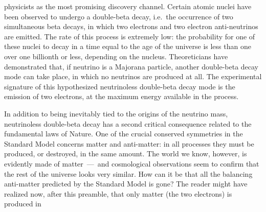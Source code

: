 physicists as the most promising discovery channel. Certain atomic nuclei have been
observed to undergo a double-beta decay, i.e.~the occurrence of two simultaneous beta
decays, in which two electrons and two electron anti-neutrinos are emitted. The rate of
this process is extremely low: the probability for one of these nuclei to decay in a time
equal to the age of the universe is less than one over one billionth or less, depending
on the nucleus. Theoreticians have demonstrated that, if neutrino is a Majorana
particle, another double-beta decay mode can take place, in which no neutrinos are
produced at all. The experimental signature of this hypothesized neutrinoless double-beta
decay mode is the emission of two electrons, at the maximum energy available in the
process.
\newpar
\begin{center}
\end{center}
In addition to being inevitably tied to the origins of the neutrino mass, neutrinoless
double-beta decay has a second critical consequence related to the fundamental laws of
Nature. One of the crucial conserved symmetries in the Standard Model concerns matter and
anti-matter: in all processes they must be produced, or destroyed, in the same amount.
The world we know, however, is evidently made of matter~---~and cosmological observations
seem to confirm that the rest of the universe looks very similar. How can it be that all
the balancing anti-matter predicted by the Standard Model is gone? The reader might have
realized now, after this preamble, that only matter (the two electrons) is produced in
